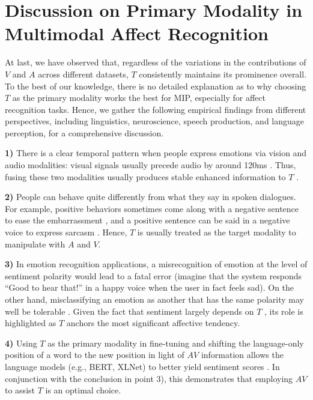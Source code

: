 \documentclass[11pt,a4paper]{article}
\begin{document}
\section{Discussion on Primary Modality in Multimodal Affect Recognition}
At last, we have observed that, regardless of the variations in the contributions of $V$ and $A$ across different datasets, $T$ consistently maintains its prominence overall. To the best of our knowledge, there is no detailed explanation as to why choosing $T$ as the primary modality works the best for MIP, especially for affect recognition tasks. Hence, we gather the following empirical findings from different perspectives, including linguistics, neuroscience, speech production, and language perception, for a comprehensive discussion.

\textbf{1)} There is a clear temporal pattern when people express emotions via vision and audio modalities: visual signals usually precede audio by around 120ms \citep{grant2001speech}. Thus, fusing these two modalities usually produces stable enhanced information to $T$ \citep{Li2020}.

\textbf{2)} People can behave quite differently from what they say in spoken dialogues. For example, positive behaviors sometimes come along with a negative sentence to ease the embarrassment \citep{li2019}, and a positive sentence can be said in a negative voice to express sarcasm \citep{castro2019towards}. Hence, $T$ is usually treated as the target modality to manipulate with $A$ and $V$.

\textbf{3)} In emotion recognition applications, a misrecognition of emotion at the level of sentiment polarity would lead to a fatal error (imagine that the system responds ``Good to hear that!'' in a happy voice when the user in fact feels sad). On the other hand, misclassifying an emotion as another that has the same polarity may well be tolerable \citep{tokuhisa2008emotion}. Given the fact that sentiment largely depends on $T$ \citep{Lindquist2015}, its role is highlighted as $T$ anchors the most significant affective tendency.

\textbf{4)} Using $T$ as the primary modality in fine-tuning and shifting the language-only position of a word to the new position in light of $AV$ information allows the language models (e.g., BERT, XLNet) to better yield sentiment scores \citep{rahman2020integrating}. In conjunction with the conclusion in point 3), this demonstrates that employing $AV$ to assist $T$ is an optimal choice.
\end{document}
